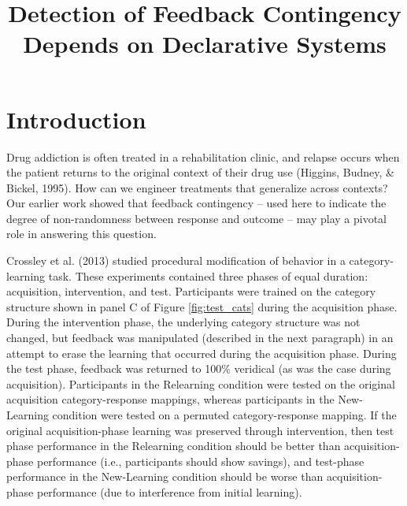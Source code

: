 \documentclass[man,apacite,draftfirst]{apa6}
\title{Detection of Feedback Contingency Depends on Declarative Systems}
\begin{document}
\maketitle

\section*{Introduction}
Drug addiction is often treated in a rehabilitation clinic, and relapse occurs
when the patient returns to the original context of their drug use (Higgins,
Budney, \& Bickel, 1995). How can we engineer treatments that generalize across
contexts? Our earlier work \cite{crossley_erasing_2013} showed that
feedback contingency -- used here to indicate the degree of non-randomness
between response and outcome -- may play a pivotal role in answering this
question.

Crossley et al. (2013) studied procedural modification of behavior in a category-learning task. These experiments contained three phases of equal duration:
acquisition, intervention, and test. Participants were trained on the category
structure shown in panel C of Figure \ref{fig:test_cats} during the acquisition
phase. During the intervention phase, the underlying category structure was not
changed, but feedback was manipulated (described in the next paragraph) in an
attempt to erase the learning that occurred during the acquisition phase. During
the test phase, feedback was returned to 100\% veridical (as was the case during
acquisition). Participants in the Relearning condition were tested on the
original acquisition category-response mappings, whereas participants in the New-Learning condition were tested on a permuted category-response mapping. If the original
acquisition-phase learning was preserved through intervention, then test phase
performance in the Relearning condition should be better than acquisition-phase
performance (i.e., participants should show savings), and test-phase performance
in the New-Learning condition should be worse than acquisition-phase performance
(due to interference from initial learning).
\end{document}
